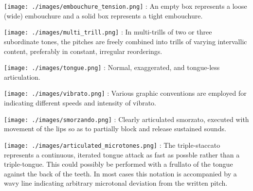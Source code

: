 \documentclass[11pt]{article}
\begin{document}
\begin{multicols}{2}
\vspace*{0.25cm}

\texttt{[image: ./images/embouchure\_tension.png]}  : An empty box represents a loose (wide) embouchure and a solid box represents a tight embouchure. \\
\rightskip\leftskip
\phantom{text} \hfill \phantom{()}

\vspace*{0.25cm}

\texttt{[image: ./images/multi\_trill.png]}  : In multi-trills of two or three subordinate tones, the pitches are freely combined into trills of varying intervallic content, preferably in constant, irregular reorderings. \\
\rightskip\leftskip
\phantom{text} \hfill \phantom{()}

\vspace*{0.25cm}

\texttt{[image: ./images/tongue.png]}  : Normal, exaggerated, and tongue-less articulation. \\
\rightskip\leftskip
\phantom{text} \hfill \phantom{()}

\vspace*{0.25cm}

\texttt{[image: ./images/vibrato.png]}  : Various graphic conventions are employed for indicating different speeds and intensity of vibrato. \\
\rightskip\leftskip
\phantom{text} \hfill \phantom{()}

\vspace*{0.25cm}

\texttt{[image: ./images/smorzando.png]}  : Clearly articulated smorzato, executed with movement of the lips so as to partially block and release sustained sounds. \\
\rightskip\leftskip
\phantom{text} \hfill \phantom{()}

\vspace*{0.25cm}

\texttt{[image: ./images/articulated\_microtones.png]}  : The triple-staccato represents a continuous, iterated tongue attack as fast as possble rather than a triple-tongue. This could possibly be performed with a frullato of the tongue against the back of the teeth. In most cases this notation is accompanied by a wavy line indicating arbitrary microtonal deviation from the written pitch. \\
\rightskip\leftskip
\phantom{text} \hfill \phantom{()}


\end{multicols}
\end{document}
